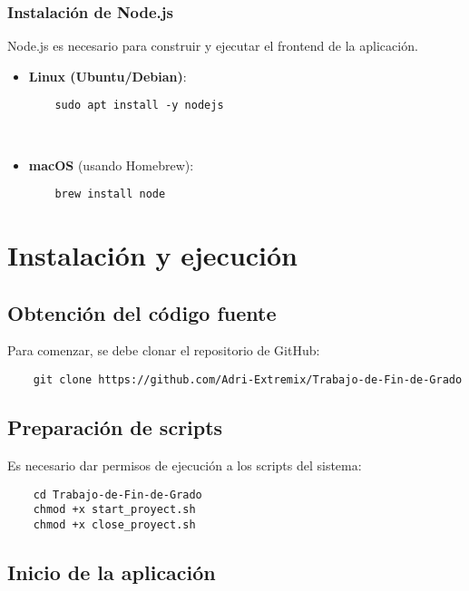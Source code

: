 \subsubsection{Instalación de Node.js}

Node.js es necesario para construir y ejecutar el frontend de la aplicación.

\begin{itemize}
    \item \textbf{Linux (Ubuntu/Debian)}:
    \begin{verbatim}
    sudo apt install -y nodejs
    \end{verbatim} 
    
    \item \textbf{macOS} (usando Homebrew):
    \begin{verbatim}
    brew install node
    \end{verbatim}
    
\end{itemize}

\section{Instalación y ejecución}

\subsection{Obtención del código fuente}

Para comenzar, se debe clonar el repositorio de GitHub:

    \begin{verbatim}
    git clone https://github.com/Adri-Extremix/Trabajo-de-Fin-de-Grado
    \end{verbatim}

\subsection{Preparación de scripts}

Es necesario dar permisos de ejecución a los scripts del sistema:

    \begin{verbatim}
    cd Trabajo-de-Fin-de-Grado
    chmod +x start_proyect.sh
    chmod +x close_proyect.sh
    \end{verbatim}

\subsection{Inicio de la aplicación}

